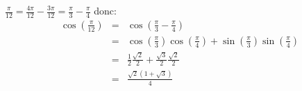 $\frac{\pi}{12} = \frac{4\pi}{12} - \frac{3\pi}{12}=\frac{\pi}{3}-\frac{\pi}{4}$ donc:
\begin{eqnarray}
  \cos\left(\frac{\pi}{12}\right) &=& \cos\left(\frac{\pi}{3}-\frac{\pi}{4}\right) \nonumber \\
    &=& \cos\left(\frac{\pi}{3}\right)\cos\left(\frac{\pi}{4}\right)+\sin\left(\frac{\pi}{3}\right)\sin\left(\frac{\pi}{4}\right)  \nonumber \\
   &=& \frac{1}{2}\frac{\sqrt{2}}{2} + \frac{\sqrt{3}}{2}\frac{\sqrt{2}}{2} \nonumber \\
                      &=&  \frac{\sqrt{2}\left(1+\sqrt{3}\right)}{4} \nonumber
\end{eqnarray}
